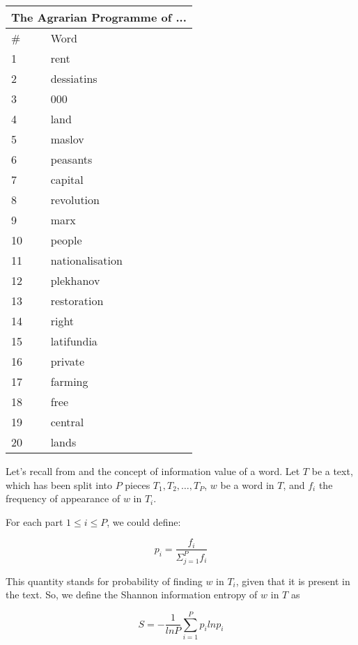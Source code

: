 \documentclass{pnastwo}
\begin{document}
\begin{article}
\begin{center}
  \begin{tabular}{ | l | l | }
    \hline
\multicolumn{2}{|c|}{The Agrarian Programme of ...} \\ \hline
\# & Word  \\ \hline
1 & rent \\ \hline
2 & dessiatins \\ \hline
3 & 000 \\ \hline
4 & land \\ \hline
5 & maslov \\ \hline
6 & peasants \\ \hline
7 & capital \\ \hline
8 & revolution \\ \hline
9 & marx \\ \hline
10 & people \\ \hline
11 & nationalisation \\ \hline
12 & plekhanov \\ \hline
13 & restoration \\ \hline
14 & right \\ \hline
15 & latifundia \\ \hline
16 & private \\ \hline
17 & farming \\ \hline
18 & free \\ \hline
19 & central \\ \hline
20 & lands \\ \hline
  \end{tabular}
\end{center}

\label{appendix1}
Let's recall from \cite{DARWIN} and \cite{ENTROPIC} the concept of information value of a word. 
Let $T$ be a text, which has been split into $P$ pieces $T_1, T_2, \dots, T_P$, $w$ be a word in $T$,
and $f_i$ the frequency of appearance of $w$ in $T_i$.

For each part $1 \leq i \leq P$, we could define:

\begin{equation}
  p_i = \frac{f_i}{\Sigma_{j=1}^{P}f_i}
\end{equation}

This quantity stands for probability of finding $w$ in $T_i$, given that it is present in the text. So, 
we define the Shannon information entropy of $w$ in $T$ as

\begin{equation}
  S = -\frac{1}{ln P}\sum_{i=1}^{P}p_i ln p_i
\end{equation}




\end{article}
\end{document}
